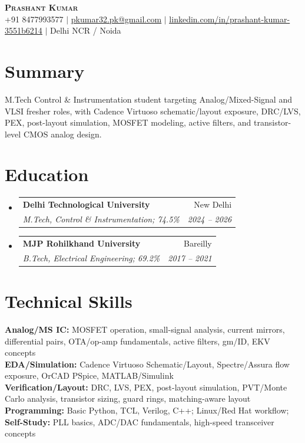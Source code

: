 \documentclass[letterpaper,10pt]{article}
\makeatletter
\newcommand{\resumeSubheading}[4]{
  \vspace{-1pt}\item
    \begin{tabular*}{0.97\textwidth}[t]{l@{\extracolsep{\fill}}r}
      \textbf{#1} & #2 \\
      \textit{\footnotesize#3} & \textit{\footnotesize #4} \\
    \end{tabular*}\vspace{-4pt}
}
\newcommand{\resumeSubHeadingListStart}{\begin{itemize}[leftmargin=0.13in, label={}, itemsep=0pt]}
\newcommand{\resumeSubHeadingListEnd}{\end{itemize}}
\makeatother
\begin{document}
\begin{center}
    \textbf{\Huge \scshape Prashant Kumar} \\ \vspace{1pt}
    \small +91 8477993577 $|$ \href{mailto:pkumar32.pk@gmail.com}{\underline{pkumar32.pk@gmail.com}} $|$
    \href{https://www.linkedin.com/in/prashant-kumar-3551b6214}{\underline{linkedin.com/in/prashant-kumar-3551b6214}} $|$ Delhi NCR / Noida
\end{center}\vspace{-12pt}

\section{Summary}
\footnotesize{M.Tech Control \& Instrumentation student targeting Analog/Mixed-Signal and VLSI fresher roles, with Cadence Virtuoso schematic/layout exposure, DRC/LVS, PEX, post-layout simulation, MOSFET modeling, active filters, and transistor-level CMOS analog design.}\vspace{-8pt}

\section{Education}
  \resumeSubHeadingListStart
    \resumeSubheading{Delhi Technological University}{New Delhi}{M.Tech, Control \& Instrumentation; 74.5\%}{2024 -- 2026}
    \resumeSubheading{MJP Rohilkhand University}{Bareilly}{B.Tech, Electrical Engineering; 69.2\%}{2017 -- 2021}
  \resumeSubHeadingListEnd

\section{Technical Skills}
 \begin{itemize}[leftmargin=0.13in, label={}, itemsep=0pt]
    \footnotesize{\item{
     \textbf{Analog/MS IC:} MOSFET operation, small-signal analysis, current mirrors, differential pairs, OTA/op-amp fundamentals, active filters, gm/ID, EKV concepts \\
     \textbf{EDA/Simulation:} Cadence Virtuoso Schematic/Layout, Spectre/Assura flow exposure, OrCAD PSpice, MATLAB/Simulink \\
     \textbf{Verification/Layout:} DRC, LVS, PEX, post-layout simulation, PVT/Monte Carlo analysis, transistor sizing, guard rings, matching-aware layout \\
     \textbf{Programming:} Basic Python, TCL, Verilog, C++; Linux/Red Hat workflow; \textbf{Self-Study:} PLL basics, ADC/DAC fundamentals, high-speed transceiver concepts
    }}
 \end{itemize}\vspace{-11pt}
\end{document}
